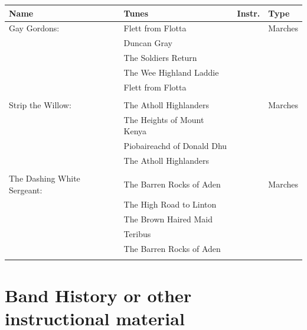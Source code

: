 \begin{tabular}{ l l l l}
  \textbf{Name} & \textbf{Tunes} & \textbf{Instr.} & \textbf{Type}\\
  \hline

Gay Gordons: & Flett from Flotta & & Marches\\ 
             & Duncan Gray & &\\
             & The Soldiers Return & &\\
             & The Wee Highland Laddie & &\\
             & Flett from Flotta & &\\
             \\
Strip the Willow: & The Atholl Highlanders & & Marches\\
                  & The Heights of Mount Kenya & &\\
                  & Piobaireachd of Donald Dhu & &\\
                  & The Atholl Highlanders & &\\
                  \\
The Dashing White Sergeant: & The Barren Rocks of Aden & & Marches\\
                            & The High Road to Linton & &\\
                            & The Brown Haired Maid & &\\
                            & Teribus & &\\
                            & The Barren Rocks of Aden & &\\
                            \\

\end{tabular}

\cleardoublepage
\chapter{Band History or other instructional material}
\vspace*{\fill}\newpage





\cleardoublepage
